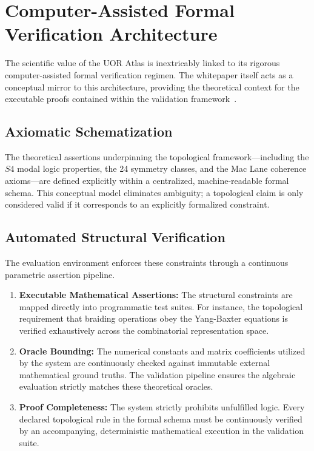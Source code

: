\section{Computer-Assisted Formal Verification Architecture}

The scientific value of the UOR Atlas is inextricably linked to its rigorous computer-assisted formal verification regimen. The whitepaper itself acts as a conceptual mirror to this architecture, providing the theoretical context for the executable proofs contained within the validation framework~\cite{hales2008}.

\subsection{Axiomatic Schematization}
The theoretical assertions underpinning the topological framework---including the $S4$ modal logic properties, the 24 symmetry classes, and the Mac Lane coherence axioms---are defined explicitly within a centralized, machine-readable formal schema. This conceptual model eliminates ambiguity; a topological claim is only considered valid if it corresponds to an explicitly formalized constraint.

\subsection{Automated Structural Verification}
The evaluation environment enforces these constraints through a continuous parametric assertion pipeline. 
\begin{enumerate}
    \item \textbf{Executable Mathematical Assertions:} The structural constraints are mapped directly into programmatic test suites. For instance, the topological requirement that braiding operations obey the Yang-Baxter equations is verified exhaustively across the combinatorial representation space.
    \item \textbf{Oracle Bounding:} The numerical constants and matrix coefficients utilized by the system are continuously checked against immutable external mathematical ground truths. The validation pipeline ensures the algebraic evaluation strictly matches these theoretical oracles.
    \item \textbf{Proof Completeness:} The system strictly prohibits unfulfilled logic. Every declared topological rule in the formal schema must be continuously verified by an accompanying, deterministic mathematical execution in the validation suite.
\end{enumerate}

